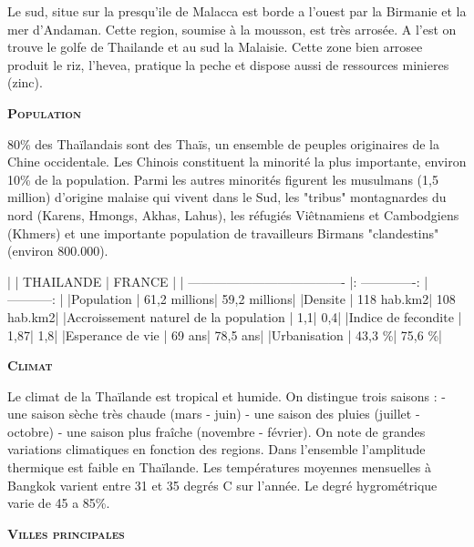 \begin{multicols}{2}
Le sud, situe sur la presqu’ile de Malacca est borde a l’ouest par la Birmanie et la mer d’Andaman. Cette region, soumise à la mousson, est très arrosée. A l’est on trouve le golfe de Thailande et au sud la Malaisie. Cette zone bien arrosee produit le riz, l’hevea, pratique la peche et dispose aussi de ressources minieres (zinc).

\textbf{\textsc{Population}}

80\% des Thaïlandais sont des Thaïs, un ensemble de peuples originaires de la Chine occidentale. Les Chinois constituent la minorité la plus importante, environ 10\% de la population. Parmi les autres minorités figurent les musulmans (1,5 million) d’origine malaise qui vivent dans le Sud, les "tribus" montagnardes du nord (Karens, Hmongs, Akhas, Lahus), les réfugiés Viêtnamiens et Cambodgiens (Khmers) et une importante population de travailleurs Birmans "clandestins" (environ 800.000).

|                                       |     THAILANDE   |    FRANCE    |
| ------------------------------------- |: -------------: | -----------: |
|Population                             |    61,2 millions| 59,2 millions|
|Densite                                |      118 hab.km2|   108 hab.km2|
|Accroissement naturel de la population |              1,1|           0,4|
|Indice de fecondite                    |             1,87|           1,8|
|Esperance de vie                       |           69 ans|      78,5 ans|
|Urbanisation                           |           43,3 \%|        75,6 \%|

\textbf{\textsc{Climat}}

Le climat de la Thaïlande est tropical et humide. On distingue trois saisons :
- une saison sèche très chaude (mars - juin)
- une saison des pluies (juillet - octobre)
- une saison plus fraîche (novembre - février).
On note de grandes variations climatiques en fonction des regions. Dans l’ensemble l’amplitude thermique est faible en Thaïlande. Les températures moyennes mensuelles à Bangkok varient entre 31 et 35 degrés C sur l’année. Le degré hygrométrique varie de 45 a 85\%.

\textbf{\textsc{Villes principales}}


\end{multicols}
